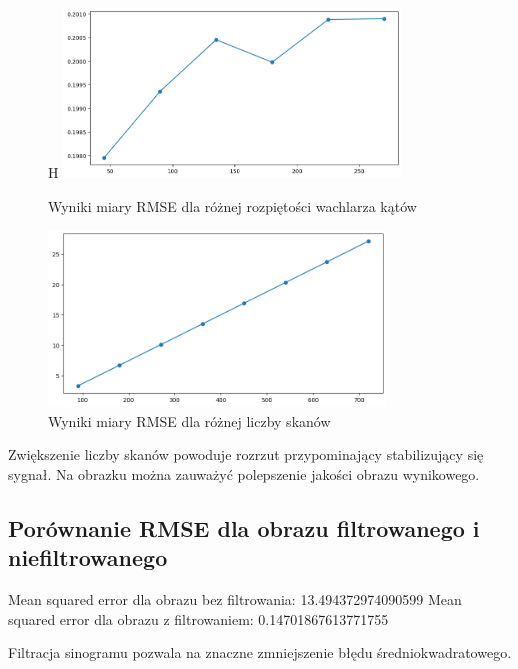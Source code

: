 \documentclass[11pt,a4paper]{article}
\begin{document}
    \begin{figure}{H}
        \centering
        \includegraphics[width=0.8\textwidth]{mse_fan}
        \caption{Wyniki miary RMSE dla różnej rozpiętości wachlarza kątów}
    \end{figure}

    \begin{figure}[H]
        \centering
        \includegraphics[width=0.8\textwidth]{mse_amount}
        \caption{Wyniki miary RMSE dla różnej liczby skanów}
    \end{figure}

    Zwiększenie liczby skanów powoduje rozrzut przypominający stabilizujący się sygnał.
    Na obrazku można zauważyć polepszenie jakości obrazu wynikowego.

    \subsection{Porównanie RMSE dla obrazu filtrowanego i niefiltrowanego}
    Mean squared error dla obrazu bez filtrowania: 13.494372974090599
    Mean squared error dla obrazu z filtrowaniem: 0.14701867613771755

    Filtracja sinogramu pozwala na znaczne zmniejszenie błędu średniokwadratowego.
\end{document}
